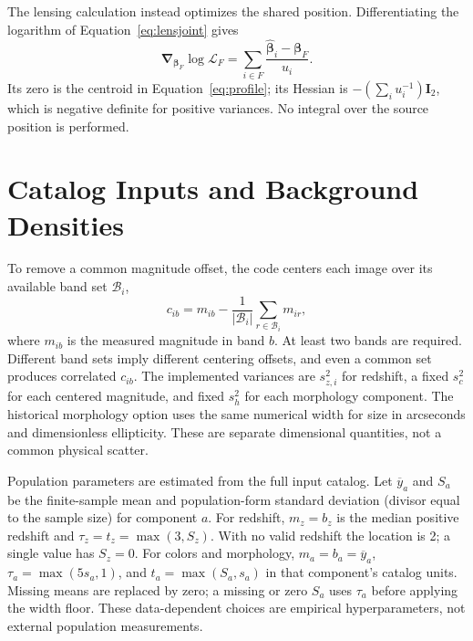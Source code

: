 \documentclass[twocolumn,twocolappendix,linenumbers]{aastex701}
\begin{document}
The lensing calculation instead optimizes the shared position.
Differentiating the logarithm of Equation~\ref{eq:lensjoint} gives
\begin{equation}
 \boldsymbol{\nabla}_{\boldsymbol\beta_F}\log\mathcal L_F
 =\sum_{i\in F}\frac{\widehat{\boldsymbol\beta}_i
                         -\boldsymbol\beta_F}{u_i}.
 \label{eq:centroidderivative}
\end{equation}
Its zero is the centroid in Equation~\ref{eq:profile}; its Hessian is $-(\sum_i u_i^{-1})\boldsymbol I_2$, which is negative definite for positive variances.
No integral over the source position is performed.

\section{Catalog Inputs and Background Densities}
\label{app:catalogdetails}
To remove a common magnitude offset, the code centers each image over its available band set $\mathcal B_i$,
\begin{equation}
 c_{ib}=m_{ib}-\frac{1}{|\mathcal B_i|}
                   \sum_{r\in\mathcal B_i}m_{ir},
 \label{eq:colors}
\end{equation}
where $m_{ib}$ is the measured magnitude in band $b$.
At least two bands are required.
Different band sets imply different centering offsets, and even a common set produces correlated $c_{ib}$.
The implemented variances are $s_{z,i}^2$ for redshift, a fixed $s_c^2$ for each centered magnitude, and fixed $s_h^2$ for each morphology component.
The historical morphology option uses the same numerical width for size in arcseconds and dimensionless ellipticity.
These are separate dimensional quantities, not a common physical scatter.

Population parameters are estimated from the full input catalog.
Let $\overline y_a$ and $S_a$ be the finite-sample mean and population-form standard deviation (divisor equal to the sample size) for component $a$.
For redshift, $m_z=b_z$ is the median positive redshift and $\tau_z=t_z=\max(3,S_z)$.
With no valid redshift the location is 2; a single value has $S_z=0$.
For colors and morphology, $m_a=b_a=\overline y_a$, $\tau_a=\max(5s_a,1)$, and $t_a=\max(S_a,s_a)$ in that component's catalog units.
Missing means are replaced by zero; a missing or zero $S_a$ uses $\tau_a$ before applying the width floor.
These data-dependent choices are empirical hyperparameters, not external population measurements.
\end{document}
